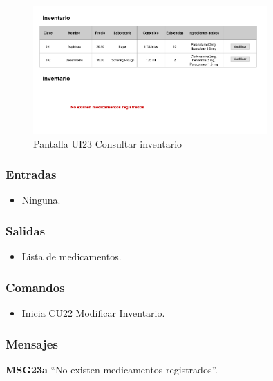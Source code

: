 \begin{figure}[htbp!]
	\centering
	\includegraphics[width=0.8\textwidth]{images/gui/ui23_consultar_inventario}
	\caption{Pantalla UI23 Consultar inventario}
\end{figure}

\subsubsection{Entradas}
\begin{itemize}
	\item Ninguna.
\end{itemize}

\subsubsection{Salidas}
\begin{itemize}
	\item Lista de medicamentos.
\end{itemize}

\subsubsection{Comandos}
\begin{itemize}
	\item {} Inicia CU22 Modificar Inventario.
\end{itemize}

\subsubsection{Mensajes}
\begin{Citemize}
	\item {\bf MSG23a} ``No existen medicamentos registrados''.
\end{Citemize}



